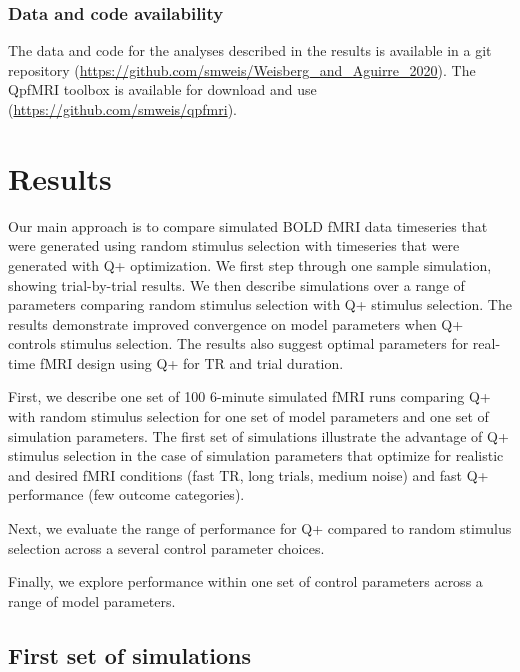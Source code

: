 \documentclass[
  man,floatsintext]{apa6}
\begin{document}
\hypertarget{data-and-code-availability}{%
\subsubsection{Data and code availability}\label{data-and-code-availability}}

The data and code for the analyses described in the results is available in a git repository (\url{https://github.com/smweis/Weisberg_and_Aguirre_2020}). The QpfMRI toolbox is available for download and use (\url{https://github.com/smweis/qpfmri}).

\hypertarget{results}{%
\section{Results}\label{results}}

Our main approach is to compare simulated BOLD fMRI data timeseries that were generated using random stimulus selection with timeseries that were generated with Q+ optimization. We first step through one sample simulation, showing trial-by-trial results. We then describe simulations over a range of parameters comparing random stimulus selection with Q+ stimulus selection. The results demonstrate improved convergence on model parameters when Q+ controls stimulus selection. The results also suggest optimal parameters for real-time fMRI design using Q+ for TR and trial duration.

First, we describe one set of 100 6-minute simulated fMRI runs comparing Q+ with random stimulus selection for one set of model parameters and one set of simulation parameters. The first set of simulations illustrate the advantage of Q+ stimulus selection in the case of simulation parameters that optimize for realistic and desired fMRI conditions (fast TR, long trials, medium noise) and fast Q+ performance (few outcome categories).

Next, we evaluate the range of performance for Q+ compared to random stimulus selection across a several control parameter choices.

Finally, we explore performance within one set of control parameters across a range of model parameters.

\hypertarget{first-set-of-simulations}{%
\subsection{First set of simulations}\label{first-set-of-simulations}}
\end{document}
